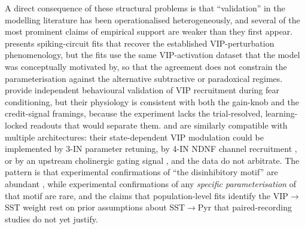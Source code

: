 \documentclass[11pt]{article}
\let\origrightarrow\rightarrow
\def\rightarrow{\ensuremath{\origrightarrow}}
\begin{document}
A direct consequence of these structural problems is that ``validation'' in the modelling literature has been operationalised heterogeneously, and several of the most prominent claims of empirical support are weaker than they first appear. \citet{Veit2023} presents spiking-circuit fits that recover the established VIP-perturbation phenomenology, but the fits use the same VIP-activation dataset that the model was conceptually motivated by, so that the agreement does not constrain the parameterisation against the alternative subtractive \citep{Tahvili2025a, Tahvili2025b} or paradoxical \citep{Garciadelmolino2017, Sanzeni2020} regimes. \citet{Krabbe2019} provide independent behavioural validation of VIP recruitment during fear conditioning, but their physiology is consistent with both the gain-knob \citep{Garciadelmolino2017, Hertag2019} and the credit-signal \citep{Wagatsuma2023, Lee2025, Hertag2020, Hertag2021} framings, because the experiment lacks the trial-resolved, learning-locked readouts that would separate them. \citet{Dipoppa2018} and \citet{Pakan2016} are similarly compatible with multiple architectures: their state-dependent VIP modulation could be implemented by 3-IN parameter retuning, by 4-IN NDNF channel recruitment \citep{Iqbal2025, Hartung2024, Vighagen2021}, or by an upstream cholinergic gating signal \citep{Fu2014, Anastasiades2021a}, and the data do not arbitrate. The pattern is that experimental confirmations of ``the disinhibitory motif'' are abundant \citep{Pi2013, Lee2013, Fu2014, Pfeffer2013, Karnani2016a, Pakan2016, Krabbe2019, Dipoppa2018, Myersjoseph2024, Veit2023}, while experimental confirmations of any \textit{specific parameterisation} of that motif are rare, and the claims that population-level fits identify the VIP\rightarrow SST weight \citep{Litwinkumar2016, Moreni2025a} rest on prior assumptions about SST\rightarrow Pyr that paired-recording studies do not yet justify.
\end{document}

